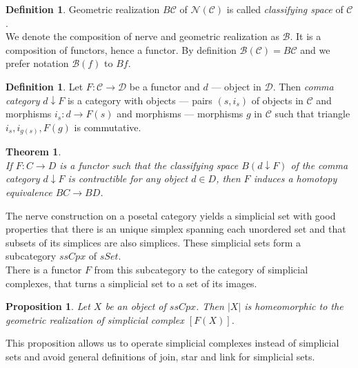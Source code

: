\documentclass[english,12pt]{article}
\newcounter{stmcounter}[section]
\newcounter{thcounter}
\numberwithin{equation}{section}
\newtheorem{proposition}[stmcounter]{Proposition}
\newtheorem{theorem}[thcounter]{Theorem}
\theoremstyle{definition}
\newtheorem{definition}[stmcounter]{Definition}
\theoremstyle{remark}
\newcommand{\define}[1]{{\textit{#1}}}
\begin{document}
\begin{definition}
  Geometric realization $B\mathcal{C}$ of $\mathcal{N}(\mathcal{C})$ is called \define{classifying space} of $\mathcal{C}$.\\

  We denote the composition of nerve and geometric realization as $\mathcal{B}$. It is a composition of functors, hence a functor. By definition $\mathcal{B}(\mathcal{C}) = B\mathcal{C}$ and we prefer notation $\mathcal{B}(f)$ to $Bf$.
\end{definition}

\begin{definition}
  Let $F: \mathcal{C} \to \mathcal{D}$ be a functor and $d$ --- object in $\mathcal{D}$. Then \define{comma category} $d \downarrow F$ is a category with objects --- pairs $(s,i_s)$ of objects in $\mathcal{C}$ and morphisms $i_s : d \to F(s)$ and morphisms --- morphisms $g$ in $\mathcal{C}$ such that triangle $i_s, i_{g(s)}, F(g)$ is commutative.
\end{definition}

\begin{theorem} {\cite[Theorem A]{Quillen72}}\\
  If $F: C \to D$ is a functor such that the classifying space $B(d \downarrow F)$ of the comma category $d \downarrow F$ is contractible for any object $d \in D$, then $F$ induces a homotopy equivalence $BC \to BD$.
\end{theorem}

The nerve construction on a posetal category yields a simplicial set with good properties that there is an unique simplex spanning each unordered set and that subsets of its simplices are also simplices. These simplicial sets form a subcategory $ssCpx$ of $sSet$.\\

There is a functor $F$ from this subcategory to the category of simplicial complexes, that turns a simplicial set to a set of its images.\\

\begin{proposition}
  Let $X$ be an object of $ssCpx$. Then $|X|$ is homeomorphic to the geometric realization of simplicial complex $[F(X)]$.
\end{proposition}

This proposition allows us to operate simplicial complexes instead of simplicial sets and avoid general definitions of join, star and link for simplicial sets.\\
\end{document}
